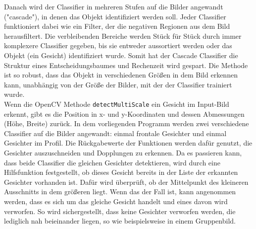 Danach wird der Classifier in mehreren Stufen auf die Bilder angewandt ("cascade"), in denen das Objekt identifiziert werden soll. Jeder Classifier funktioniert dabei wie ein Filter, der die negativen Regionen aus dem Bild herausfiltert. Die verbleibenden Bereiche werden Stück für Stück durch immer komplexere Classifier gegeben, bis sie entweder aussortiert werden oder das Objekt (ein Gesicht) identifiziert wurde. Somit hat der Cascade Classifier die Struktur eines Entscheidungsbaumes und Rechenzeit wird gespart. Die Methode ist so robust, dass das Objekt in verschiedenen Größen in dem Bild erkennen kann, unabhängig von der Größe der Bilder, mit der der Classifier trainiert wurde.\\
Wenn die OpenCV Methode \texttt{detectMultiScale} ein Gesicht im Input-Bild erkennt, gibt es die Position in x- und y-Koordinaten und dessen Abmessungen (Höhe, Breite) zurück. In dem vorliegenden Programm werden zwei verschiedene Classifier auf die Bilder angewandt: einmal frontale Gesichter und einmal Gesichter im Profil. Die Rückgabewerte der Funktionen werden dafür genutzt, die Gesichter auszuschneiden und Dopplungen zu erkennen. Da es passieren kann, dass beide Classifier die gleichen Gesichter detektieren, wird durch eine Hilfsfunktion festgestellt, ob dieses Gesicht bereits in der Liste der erkannten Gesichter vorhanden ist. Dafür wird überprüft, ob der Mittelpunkt des kleineren Ausschnitts in dem größeren liegt. Wenn das der Fall ist, kann angenommen werden, dass es sich um das gleiche Gesicht handelt und eines davon wird verworfen. So wird sichergestellt, dass keine Gesichter verworfen werden, die lediglich nah beieinander liegen, so wie beispielsweise in einem Gruppenbild.
